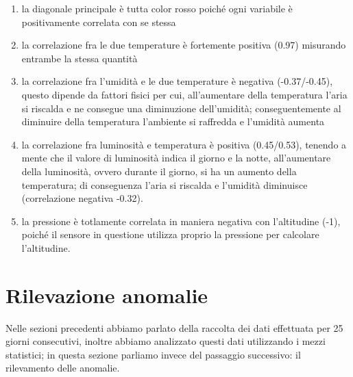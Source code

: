 \documentclass[fleqn, 10pt]{SelfArx}
\begin{document}
\begin{enumerate}
  \item la diagonale principale è tutta color rosso poiché ogni variabile è positivamente correlata con se stessa
  \item la correlazione fra le due temperature è fortemente positiva (0.97) misurando entrambe la stessa quantità
  \item la correlazione fra l'umidità e le due temperature è negativa (-0.37/-0.45), questo dipende da fattori fisici per cui, all'aumentare della temperatura l'aria si riscalda e ne consegue una diminuzione dell'umidità; 
  conseguentemente al diminuire della temperatura l'ambiente si raffredda e l'umidità aumenta
  \item la correlazione fra luminosità e temperatura è positiva (0.45/0.53), tenendo a mente che il valore di luminosità indica il giorno e la notte, all'aumentare della luminosità, ovvero durante il giorno, si ha un aumento
  della temperatura; di conseguenza l'aria si riscalda e l'umidità diminuisce (correlazione negativa -0.32). 
  \item la pressione è totlamente correlata in maniera negativa con l'altitudine (-1), poiché il sensore in questione utilizza proprio la pressione per calcolare l'altitudine.
\end{enumerate}

\section{Rilevazione anomalie}

Nelle sezioni precedenti abbiamo parlato della raccolta dei dati effettuata per 25 giorni consecutivi, inoltre abbiamo analizzato questi dati utilizzando i mezzi statistici; in questa sezione parliamo invece del passaggio 
successivo: il rilevamento delle anomalie. 
\end{document}
